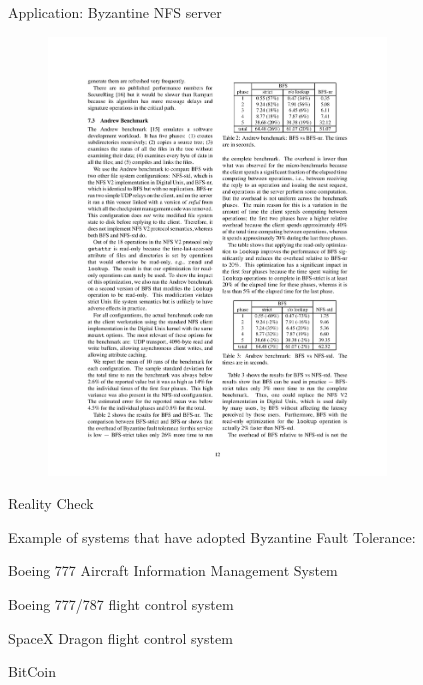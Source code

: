 \begin{frame}{Application: Byzantine NFS server}
	
\begin{figure}
	\includegraphics[width=0.8\textwidth]{andrew1}
\end{figure}	
	
\end{frame}

\begin{frame}{Reality Check}
	
Example of systems that have adopted Byzantine Fault Tolerance:
\BI
\item Boeing 777 Aircraft Information Management System 
\item Boeing 777/787 flight control system
\item SpaceX Dragon flight control system
\item BitCoin
\EI
	
\end{frame}


\begin{RMFrame}

\BI
\item {}
\EI

\end{RMFrame}

